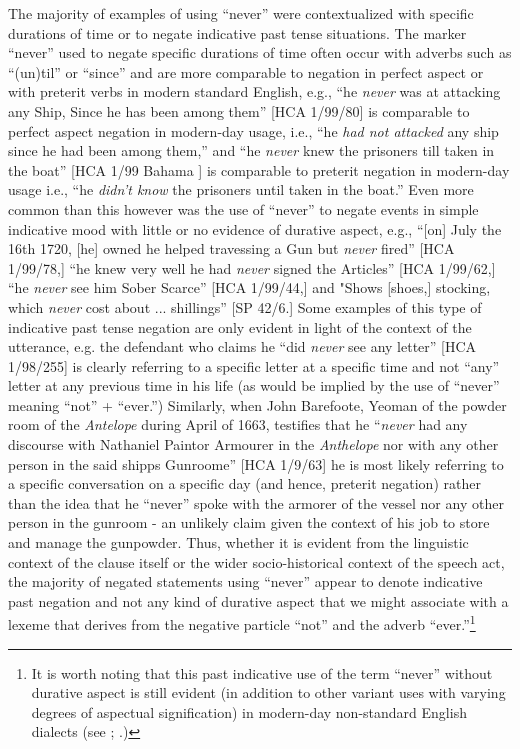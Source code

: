 The majority of examples of using “never” were contextualized with specific durations of time or to negate indicative past tense situations. The marker “never” used to negate specific durations of time often occur with adverbs such as “(un)til” or “since” and are more comparable to negation in perfect aspect or with preterit verbs in modern standard English, e.g., “he \textit{never} was at attacking any Ship, Since he has been among them” [HCA 1/99/80] is comparable to perfect aspect negation in modern-day usage, i.e., “he \textit{had not attacked} any ship since he had been among them,” and “he \textit{never} knew the prisoners till taken in the boat” [HCA 1/99 Bahama \citealt{Islands1722}] is comparable to preterit negation in modern-day usage i.e., “he \textit{didn't know} the prisoners until taken in the boat.” Even more common than this however was the use of “never” to negate events in simple indicative mood with little or no evidence of durative aspect, e.g., “[on] July the 16th 1720, [he] owned he helped travessing a Gun but \textit{never} fired” [HCA 1/99/78,] “he knew very well he had \textit{never} signed the Articles” [HCA 1/99/62,] “he \textit{never} see him Sober Scarce” [HCA 1/99/44,] and "Shows [shoes,] stocking, which \textit{never} cost about ... shillings” [SP 42/6.] Some examples of this type of indicative past tense negation are only evident in light of the context of the utterance, e.g. the defendant who claims he “did \textit{never} see any letter” [HCA 1/98/255] is clearly referring to a specific letter at a specific time and not “any” letter at any previous time in his life (as would be implied by the use of “never” meaning “not” + “ever.”) Similarly, when John Barefoote, Yeoman of the powder room of the \textit{Antelope} during April of 1663, testifies that he “\textit{never} had any discourse with Nathaniel Paintor Armourer in the \textit{Anthelope} nor with any other person in the said shipps Gunroome” [HCA 1/9/63] he is most likely referring to a specific conversation on a specific day (and hence, preterit negation) rather than the idea that he “never” spoke with the armorer of the vessel nor any other person in the gunroom - an unlikely claim given the context of his job to store and manage the gunpowder. Thus, whether it is evident from the linguistic context of the clause itself or the wider socio-historical context of the speech act, the majority of negated statements using “never” appear to denote indicative past negation and not any kind of durative aspect that we might associate with a lexeme that derives from the negative particle “not” and the adverb “ever.”\footnote{It is worth noting that this past indicative use of the term “never” without durative aspect is still evident (in addition to other variant uses with varying degrees of aspectual signification) in modern-day non-standard English dialects (see \citealt{LucasWills2012}; \citealt{Mazzen2004}.)}  

